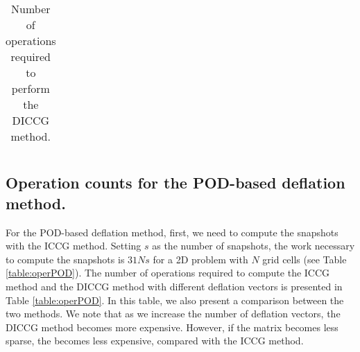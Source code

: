 \documentclass[12pt]{article}
\begin{document}
{\begin{table}[!h]
\begin{tabular}{ |l|c|c| }

\hline
\end{tabular}\caption{Number of operations required to perform the DICCG method.}\label{table:nod}
\end{table}

\clearpage

\newpage

\subsection{Operation counts for the POD-based deflation method.}
For the POD-based deflation method, first, we need to compute the snapshots with the ICCG method. Setting $s$ as the number of snapshots, the work necessary to compute the snapshots is $31Ns$ for a 2D problem with $N$ grid cells (see Table \ref{table:operPOD}). The number of operations required to compute the ICCG method and the DICCG method with different deflation vectors is presented in Table \ref{table:operPOD}. In this table, we also present a comparison between the two methods. We note that as we increase the number of deflation vectors, the DICCG method becomes more expensive. However, if the matrix becomes less sparse, the becomes less expensive, compared with the ICCG method.  %

 \begin{table}[!h]
 \centering
\begin{tabular}{ |c|c|c|c|c|c| } 


\end{tabular}
\end{table}}
\end{document}
